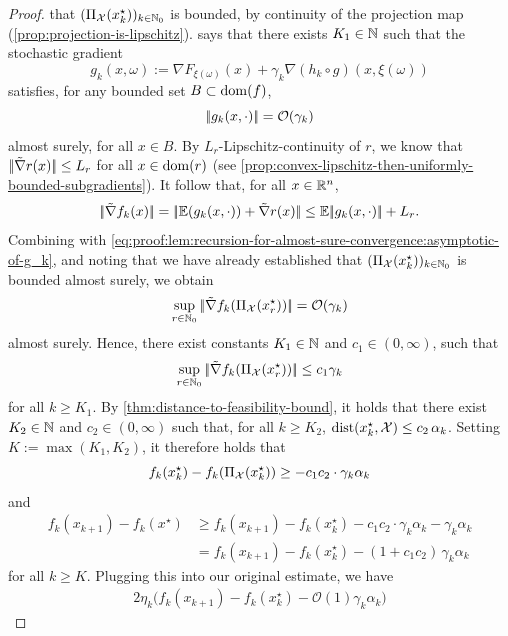 \begin{proof}
    that $(\operatorname{\Pi_\mathcal{X}}(x_k^\star))_{k\in\mathbb{N}_0}$ is bounded, by continuity
    of the projection map (\cref{prop:projection-is-lipschitz}).
     says
    that there exists $K_1\in\mathbb{N}$ such that
    the stochastic gradient
    \[
        g_k(x, \omega) := \nabla F_{\xi(\omega)}(x) + \gamma_k \nabla (h_k \circ g)(x, \xi(\omega))
    \]
    satisfies, for any bounded set $B\subset\operatorname{dom}(f)$,
    \begin{equation}
        \label{eq:proof:lem:recursion-for-almost-sure-convergence:asymptotic-of-g_k}
        |\!|g_k(x, \cdot)|\!| = \mathcal{O}(\gamma_k)
    \end{equation}
    almost surely, for all $x\in B$.
    By $L_r$-Lipschitz-continuity of $r$, we know that $|\!|\tilde{\nabla} r(x)|\!| \leq L_r$ for all $x\in\operatorname{dom}(r)$
    (see \cref{prop:convex-lipschitz-then-uniformly-bounded-subgradients}).
    It follow that, for all $x\in\mathbb{R}^n$,
    \[
        |\!|\tilde{\nabla} f_k(x)|\!| = |\!|\mathbb{E}(g_k(x, \cdot)) + \tilde{\nabla} r(x)|\!|
        \leq \mathbb{E}|\!|g_k(x, \cdot)|\!| + L_r.
    \]
    Combining with \eqref{eq:proof:lem:recursion-for-almost-sure-convergence:asymptotic-of-g_k},
    and noting that we have already established that $(\operatorname{\Pi_\mathcal{X}}(x_k^\star))_{k\in\mathbb{N}_0}$ is bounded almost surely,
    we obtain
    \[
        \sup_{r\in\mathbb{N}_0} |\!|\tilde{\nabla} f_k(\operatorname{\Pi_\mathcal{X}}(x_r^\star))|\!| = \mathcal{O}(\gamma_k)
    \]
    almost surely. Hence, there exist constants $K_1\in\mathbb{N}$ and $c_1\in(0,\infty)$, such that
    \[
        \sup_{r\in\mathbb{N}_0} |\!|\tilde{\nabla} f_k(\operatorname{\Pi_\mathcal{X}}(x_r^\star))|\!|
        \leq c_1 \gamma_k
    \]
    for all $k\geq K_1$.
    By \cref{thm:distance-to-feasibility-bound}, it holds that there exist
    $K_2\in\mathbb{N}$ and $c_2\in(0,\infty)$ such that, for all $k\geq K_2$, $\operatorname{dist}(x_k^\star,\mathcal{X}) \leq c_2 \, \alpha_k$.
    Setting $K := \max(K_1, K_2)$, it therefore holds that
    \[
        f_k(x_k^\star) - f_k(\operatorname{\Pi_\mathcal{X}}(x_k^\star)) \geq -c_1c_2 \cdot \gamma_k \alpha_k
    \]
    and
    \begin{align*}
        f_k(x_{k+1}) - f_k(x^\star)
        &\geq
        f_k(x_{k+1}) - f_k(x_k^\star)
        -c_1c_2\cdot \gamma_k\alpha_k - \gamma_k\alpha_k \\
        &=
        f_k(x_{k+1}) - f_k(x_k^\star)
        -(1 + c_1c_2) \, \gamma_k\alpha_k
    \end{align*}
    for all $k\geq K$.
    Plugging this into our original estimate, we have
    \begin{align*}
        2\eta_k\big(f_k(x_{k+1}) - f_k(x_k^\star) - \mathcal{O}(1)\gamma_k\alpha_k\big)

\end{align*}
\end{proof}
